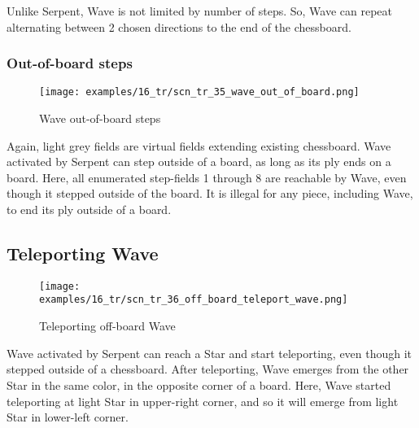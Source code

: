 Unlike Serpent, Wave is not limited by number of steps. So, Wave can repeat
alternating between 2 chosen directions to the end of the chessboard.

\clearpage %

\subsubsection*{Out-of-board steps}
\label{sec:Tamoanchan Revisited/Serpent/Activating Wave/Out-of-board steps}

\vspace*{-1.0\baselineskip}
\noindent
\begin{figure}[!h]
\texttt{[image: examples/16\_tr/scn\_tr\_35\_wave\_out\_of\_board.png]}
\caption{Wave out-of-board steps}
\label{fig:scn_tr_35_wave_out_of_board}
\end{figure}

Again, light grey fields are virtual fields extending existing chessboard.
Wave activated by Serpent can step outside of a board, as long as its ply
ends on a board. Here, all enumerated step-fields 1 through 8 are reachable
by Wave, even though it stepped outside of the board. It is illegal for any
piece, including Wave, to end its ply outside of a board.

\clearpage %

\subsection*{Teleporting Wave}
\label{sec:Tamoanchan Revisited/Serpent/Teleporting Wave}

\vspace*{-1.0\baselineskip}
\noindent
\begin{figure}[!h]
\texttt{[image: examples/16\_tr/scn\_tr\_36\_off\_board\_teleport\_wave.png]}
\caption{Teleporting off-board Wave}
\label{fig:scn_tr_36_off_board_teleport_wave}
\end{figure}

Wave activated by Serpent can reach a Star and start teleporting, even
though it stepped outside of a chessboard. After teleporting, Wave emerges
from the other Star in the same color, in the opposite corner of a board.
Here, Wave started teleporting at light Star in upper-right corner, and
so it will emerge from light Star in lower-left corner.

